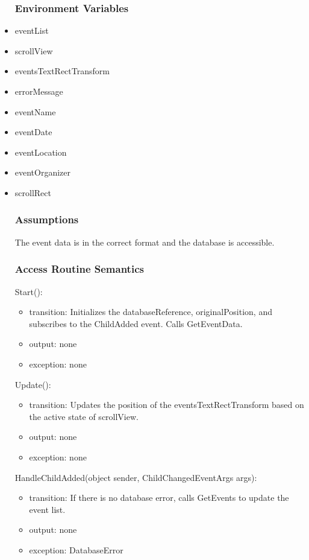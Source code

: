 \documentclass[12pt, titlepage]{article}
\begin{document}
\begin{itemize}
\subsubsection{Environment Variables}

\item eventList
\item scrollView
\item eventsTextRectTransform
\item errorMessage
\item eventName
\item eventDate
\item eventLocation
\item eventOrganizer
\item scrollRect

\subsubsection{Assumptions}

The event data is in the correct format and the database is accessible.

\subsubsection{Access Routine Semantics}

\noindent Start():
\begin{itemize}
\item transition: Initializes the databaseReference, originalPosition, and subscribes to the ChildAdded event. Calls GetEventData.
\item output: none
\item exception: none
\end{itemize}

\noindent Update():
\begin{itemize}
\item transition: Updates the position of the eventsTextRectTransform based on the active state of scrollView.
\item output: none
\item exception: none
\end{itemize}

\noindent HandleChildAdded(object sender, ChildChangedEventArgs args):
\begin{itemize}
\item transition: If there is no database error, calls GetEvents to update the event list.
\item output: none
\item exception: DatabaseError
\end{itemize}


\end{itemize}
\end{document}
